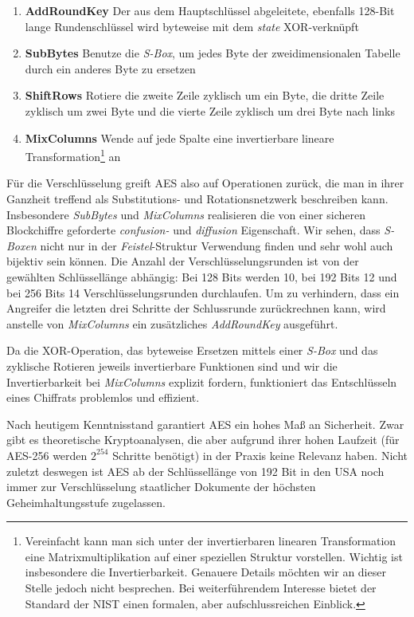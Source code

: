 \begin{enumerate}
	\small
	\item \textbf{AddRoundKey} Der aus dem Hauptschlüssel abgeleitete, ebenfalls 128-Bit lange Rundenschlüssel wird byteweise mit dem \textit{state} XOR-verknüpft
	\item \textbf{SubBytes} Benutze die \textit{S-Box}, um jedes Byte der zweidimensionalen Tabelle durch ein anderes Byte zu ersetzen
	\item \textbf{ShiftRows} Rotiere die zweite Zeile zyklisch um ein Byte, die dritte Zeile zyklisch um zwei Byte und die vierte Zeile zyklisch um drei Byte nach links
	\item \textbf{MixColumns} Wende auf jede Spalte eine invertierbare lineare Transformation\footnote{Vereinfacht kann man sich unter der invertierbaren linearen Transformation eine Matrixmultiplikation auf einer speziellen Struktur vorstellen. Wichtig ist insbesondere die Invertierbarkeit. Genauere Details möchten wir an dieser Stelle jedoch nicht besprechen. Bei weiterführendem Interesse bietet der Standard der NIST \cite{NIST_AES01} einen formalen, aber aufschlussreichen Einblick.} an
\end{enumerate}

Für die Verschlüsselung greift AES also auf Operationen zurück, die man in ihrer Ganzheit treffend als Substitutions- und Rotationsnetzwerk beschreiben kann. Insbesondere \textit{SubBytes} und \textit{MixColumns} realisieren die von einer sicheren Blockchiffre geforderte \textit{confusion-} und \textit{diffusion} Eigenschaft. Wir sehen, dass \textit{S-Boxen} nicht nur in der \textit{Feistel}-Struktur Verwendung finden und sehr wohl auch bijektiv sein können.
Die Anzahl der Verschlüsselungsrunden ist von der gewählten Schlüssellänge abhängig: Bei 128 Bits werden 10, bei 192 Bits 12 und bei 256 Bits 14 Verschlüsselungsrunden durchlaufen. Um zu verhindern, dass ein Angreifer die letzten drei Schritte der Schlussrunde zurückrechnen kann, wird anstelle von \textit{MixColumns} ein zusätzliches \textit{AddRoundKey} ausgeführt.

Da die XOR-Operation, das byteweise Ersetzen mittels einer \textit{S-Box} und das zyklische Rotieren jeweils invertierbare Funktionen sind und wir die Invertierbarkeit bei \textit{MixColumns} explizit fordern, funktioniert das Entschlüsseln eines Chiffrats problemlos und effizient.

Nach heutigem Kenntnisstand garantiert AES ein hohes Maß an Sicherheit. Zwar gibt es theoretische Kryptoanalysen, die aber aufgrund ihrer hohen Laufzeit (für AES-256 werden $2^{254}$ Schritte benötigt) in der Praxis keine Relevanz haben. Nicht zuletzt deswegen ist AES ab der Schlüssellänge von 192 Bit in den USA noch immer zur Verschlüsselung staatlicher Dokumente der höchsten Geheimhaltungsstufe zugelassen.

